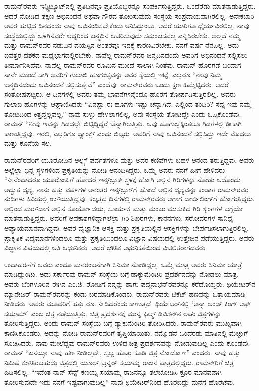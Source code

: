 ರಾಮನ್‌ರವರು ಇನ್ಸ್ಟಿಟ್ಯೂಟ್‌ನಲ್ಲಿ ಪ್ರತಿದಿನವೂ ಪ್ರತಿಯೊಬ್ಬರನ್ನೂ ಸಂಪರ್ಕಿಸುತ್ತಿದ್ದರು. ಒಂದೆರೆಡು ಮಾತನಾಡುತ್ತಿದ್ದರು. ಆದರೆ ನೋಡಿದ ತಕ್ಷಣ ಅಭಿನಂದನೆ ಅಥವಾ ಗೌರವ ತೋರಿಸುವುದು ಸಂಸ್ಥೆಯ ಸಂಪ್ರದಾಯವಾಗಿರಲಿಲ್ಲ. ಅನೇಕಬಾರಿ ಅವರ ಹುಟ್ಟಿದ ದಿನದಂದು ನಾವು ಅಭಿನಂದಿಸಬೇಕೆಂದು ಅನಿಸಿದ್ದುಂಟು. ಆದರೆ ಯಾರಿಗೂ ಧೈರ್ಯವಿರಲಿಲ್ಲ. ನಾವು ಸಂಸ್ಥೆಯಲ್ಲಿದ್ದು ಒಳಗಿನವರೇ ಆದ್ದರಿಂದ ಜನ್ಮದಿನ ಆಚರಿಸುವುದು ಸಮಂಜಸವಲ್ಲ ಎನ್ನಿಸಿರಬೇಕು. ಅಲ್ಲದೆ ನಮ್ಮ ಮತ್ತು ರಾಮನ್‌ರವರ ನಡುವಿನ ವಯಸ್ಸಿನ ಅಂತರವೂ ಇದಕ್ಕೆ ಕಾರಣವಿರಬೇಕು. ನನಗೆ ವರ್ಷ ನೆನಪಿಲ್ಲ. ಅದು ಐವತ್ತರ ದಶಕದ ಮಧ್ಯಭಾಗದಲ್ಲಿರಬೇಕು. ನಾವೆಲ್ಲ ರಾಮನ್‌ರವರ ಜನ್ಮದಿನದಂದು ಅವರಿಗೆ ಅಭಿನಂದನೆ ಸಲ್ಲಿಸಲು ತೀರ್ಮಾನಿಸಿದೆವು. ನಾವೆಲ್ಲ ರಾಮನ್‌ರವರ ರೂಮಿನ ಮುಂದೆ ಸಾಲಾಗಿ ನಿಂತೆವು. ರಾಮನ್ ಹೊರಗಡೆ ಬಂದಾಗ ನಾನೇ ಮುಂದೆ ಸಾಗಿ ಅವರಿಗೆ ಗುಲಾಬಿ ಹೂಗುಚ್ಛವನ್ನು ಅವರ ಕೈಯಲ್ಲಿ ಇಟ್ಟೆ. ಎಲ್ಲರೂ “ನಾವು ನಿಮ್ಮ ಜನ್ಮದಿನದಂದು ಅಭಿನಂದನೆ ಸಲ್ಲಿಸುತ್ತೇವೆ” ಎಂದೆವು. ರಾಮನ್‌ರವರು ಒಂದು ಕ್ಷಣ ಹಿಮ್ಮೆಟ್ಟಿದರು. ಆದರೆ ಸಂತೋಷಪಟ್ಟರು. ಆ ದಿನಗಳಲ್ಲಿ ಅವರು ತಮ್ಮ ಭಾವನೆಗಳನ್ನೆಂದೂ ಹೊರಗೆ ತೋರ್ಪಡಿಸುತ್ತಿರಲಿಲ್ಲ. ಅವರು ಗುಲಾಬಿ ಹೂಗಳನ್ನು ಆಘ್ರಾಣಿಸಿದರು “ಏನಪ್ಪಾ ಈ ಹೂಗಳು ಇಷ್ಟು ಚೆನ್ನಾಗಿದೆ. ಎಲ್ಲಿಂದ ತಂದಿರಿ? ಸದ್ಯ ಇವು ನಮ್ಮ ತೋಟದಿಂದ ಕಿತ್ತದ್ದಲ್ಲವಲ್ಲ.” ನಾವು ಸುಳ್ಳು ಹೇಳಲಾಗಲಿಲ್ಲ, ಅವು ಸಂಸ್ಥೆಯ ತೋಟದ್ದೇ ಎಂದು ಒಪ್ಪಿಕೊಂಡೆವು. ರಾಮನ್ “ನೀವು ಇವನ್ನು ಗಿಡದಲ್ಲೇ ಬಿಟ್ಟಿದ್ದಿದ್ದರೆ ಚೆನ್ನಾಗಿರುತ್ತಿತ್ತು. ಅವು ಹೂಗುಚ್ಛಕ್ಕಿಂತಲೂ ಗಿಡಗಳಲ್ಲಿ ಢೀಕಾಗಿ ಕಾಣುತ್ತಿದ್ದವು. ಇರಲಿ, ಎಲ್ಲರಿಗೂ ಥ್ಯಾಂಕ್ಸ್ ಎಂದು ಬಿಟ್ಟರು. ಅವರಿಗೆ ನಾವು ಅಭಿನಂದನೆ ಸಲ್ಲಿಸಿದ್ದು ಇದೇ ಮೊದಲು ಮತ್ತು ಕೊನೆಯ ಸಲ.

ರಾಮನ್‍ರವರಿಗೆ ಯೂರೋಪಿನ ಆಲ್ಪ್ಸ್ ಪರ್ವತಗಳೂ ಮತ್ತು ಅದರ ಕಣಿವೆಗಳು ಬಹಳ ಆನಂದ ತರುತ್ತಿದ್ದವು. ಅವರು ಅಲ್ಲೆಲ್ಲಾ ಭಿನ್ನ ಸ್ಥಳಗಳಿಂದ ಪ್ರಕೃತಿಯನ್ನು ನೋಡಿ ಆನಂದಿಸಿದ್ದರು. ಒಮ್ಮೆ ಅವರು ನನಗೆ ಹೀಗೆ ಹೇಳಿದರು “ನೀನೆಂದಾದರೂ ಯೂರೋಪಿಗೆ ಹೋದರೆ ಇನ್ಸ್‌ಬ್ರುಕ್ ಸ್ಥಳಕ್ಕೆ ಹೋಗಿ ಅಲ್ಲಿನ ಗಿರಿಗಳನ್ನು ನೋಡು ಅದೊಂದು ಅದ್ಭುತ ದೃಶ್ಯ. ನಾನು ಹತ್ತು ವರ್ಷಗಳ ಅನಂತರ ಇನ್ಸ್‌ಬ್ರುಕ್‌ಗೆ ಹೋದೆ ಅಲ್ಲಿನ ದೃಶ್ಯವನ್ನು ಕಂಡಾಗ ರಾಮನ್‌ರವರ ನುಡಿಗಳು ಕಿವಿಯಲ್ಲಿ ಉಳಿಯುತ್ತಿದ್ದವು. ಕಲ್ಕತ್ತದ ದಿನಗಳಲ್ಲಿ ರಾಮನ್‌ರವರು ಆಗಾಗ ಡಾರ್ಜಿಲಿಂಗ್‌ಗೆ ಹೋಗುತ್ತಿದ್ದರು. ಅಲ್ಲಿಂದ ಮರಳಿದಾಗ ಅಲ್ಲಿನ ಸೂರ್ಯೋದಯ, ಸೂರ್ಯಸ್ತ ಮತ್ತು ಮಂಜು ಮುಸುಕಿದ ಗಿರಿ ಶೃಂಗಗಳ ಬಗ್ಗೆಯೇ ಮಾತನಾಡುತ್ತಿದ್ದರು. ಅವರಿಗೆ ಅವಕಾಶಗಳಿದ್ದಾಗಲೆಲ್ಲಾ ಗಿರಿ ಶಿಖರಗಳು, ಕಾನನಗಳು, ಸರೋವರಗಳ ಸಾನಿಧ್ಯ ಆಪ್ಯಾಯಮಾನವಾಗಿದ್ದವು. ಅವರ ವೈಜ್ಞಾನಿಕ ಆಸಕ್ತಿ ಮತ್ತು ಪ್ರಕೃತಿಯಲ್ಲಿನ ಆಸಕ್ತಿಗಳನ್ನು ಬೇರ್ಪಡಿಸಲಾಗುತ್ತಿರಲಿಲ್ಲ. ಪ್ರಾಕೃತಿಕ ವಿದ್ಯಮಾನಗಳಿಂದಲೂ ಮತ್ತು ಪ್ರಕೃತಿಯಿಂದಲೂ ವಿಜ್ಞಾನ ವಿಷಯದಲ್ಲಿ ಉತ್ತೇಜನ ಪಡೆಯುತ್ತಿದ್ದರು. ಅವರು ವಿಜ್ಞಾನ ವಿಷಯದಲ್ಲಿ ಅತಿ ಆಧುನಿಕರು. ಆದರೆ ಭೌತಿಕ ಆಧುನಿಕತೆಯಿಂದ ವಿಚಲಿತರಾಗದವರು.

ಉದಾಹರಣೆಗೆ ಅವರು ಎಂದೂ ಮನರಂಜನೆಗಾಗಿ ಸಿನಿಮಾ ನೋಡಿದ್ದಲ್ಲ. ಒಮ್ಮೆ ಮಾತ್ರ ಅವರು ಸಿನಿಮಾ ಯಾತ್ರೆ ಮಾಡಿದ್ದುಂಟು. ಅದು ಸರ್ಕಾರವು ರಾಮನ್ ಸಂಸ್ಥೆಯ ಬಗ್ಗೆ ಡಾಕ್ಯುಮೆಂಟರಿ ಪ್ರದರ್ಶನವನ್ನು ನೋಡಲು ಮಾತ್ರ. ಅವರು ಬೆಂಗಳೂರಿನ ಈಗಿನ ಎಂ.ಜಿ. ರೋಡಿಗೆ ನನ್ನನ್ನು ಹಾಗು ಪದ್ಮನಾಭನ್‌ರವರನ್ನೂ ಕರೆದೊಯ್ದರು. ಥಿಯೇಟರ್‌ನ ಮ್ಯಾನೇಜರ್ ರಾಮನ್‌ರವರನ್ನು ಕಂಡು ಬರಮಾಡಿಕೊಂಡರು. ರಾಮನ್‌ರವರು ಟಿಕೆಟ್ ಹಣವನ್ನು ಒತ್ತಾಯಮಾಡಿ ನೀಡಿದರು. ಅವರು ಮೂವರಿಗೆ ಹತ್ತು ರೂ. ನೀಡಿದರೆಂದು ಕಾಣುತ್ತದೆ. ಥಿಯೇಟರ್‌ನಲ್ಲಿ ‘ಅನ್ನಾ ಅಂಡ್ ಕಿಂಗ್ ಆಫ್ ಸಯಾಮ್’ ಎಂಬ ಚಿತ್ರ ನಡೆಯುತ್ತಿತ್ತು. ಚಿತ್ರ ಪ್ರದರ್ಶನಕ್ಕೆ ಮುನ್ನ ಫಿಲ್ಮ್ ಡಿವಿಶನ್‌ನ ಲಘು ಚಿತ್ರಗಳನ್ನು ತೋರಿಸುತ್ತಿದ್ದರು. ಅಂದು ರಾಮನ್ ಸಂಸ್ಥೆಯ ಬಗ್ಗೆ ಡ್ಯಾಕುಮೆಂಟರಿ ತೋರಿಸಿದರು. ರಾಮನ್‌ರವರು ಮುಖ್ಯವಾಗಿ ಕಾಣಿಸಿಕೊಂಡರು. ಅದನ್ನು ನೋಡಿ ರಾಮನ್‍ರವರಿಗೆ ತೃಪ್ತಿಯಾಯಿತು. ನಮ್ಮೊಡನೆ ಒಂದೆರಡು ಮಾತಿನಲ್ಲಿ ಮೆಚ್ಚುಗೆ ಸೂಚಿಸಿದರು. ನಾವು ಮೇಲೆದ್ದವು ರಾಮನ್‌ರವರು ಉಳಿದ ಚಿತ್ರ ಪ್ರದರ್ಶನವನ್ನು ನೋಡುವುದಿಲ್ಲ ಎಂದು ಕೊಂಡೆವು. ರಾಮನ್ “ಏನಯ್ಯಾ ನಾವು ಹಣ ನೀಡಿಲ್ಲವೇ, ಸ್ವಲ್ಪ ಹೊತ್ತು ಕೂಡಿ ಚಿತ್ರ ನೋಡೋಣ” ಎಂದರು. ನಾವು ಹತ್ತು ನಿಮಿಷ ಕುಳಿತಿರಬಹುದು ಚಿತ್ರದಲ್ಲಿ ಯೂಲ್ ಬ್ರನ್ನರ್ ಸಯಾಮ್ನ ರಾಜನ ಪಾತ್ರದಲ್ಲಿದ್ದರು. ರಾಮನ್‌ರಿಗೆ ಚಿತ್ರ ಹಿಡಿಸಲಿಲ್ಲ. “ಇದೆಂತ ನಾನ್ ಸೆನ್ಸ್ ಕಣಯ್ಯ ಸಯಾಮ್ನ ರಾಜನನ್ನೂ ತಲೆಬೋಡಿಸಿ ಕ್ರೂರ ಮಾನವನಾಗಿ ತೋರಿಸುವುದೇ ಇದು ನನಗೆ ಇಷ್ಟವಾಗುವುದಿಲ್ಲ” ನಾವು ಥಿಯೇಟರ್‌ನಿಂದ ಹೊರಬಿದ್ದು ಮನೆಗೆ ಹೊರೆಟೆವು.

